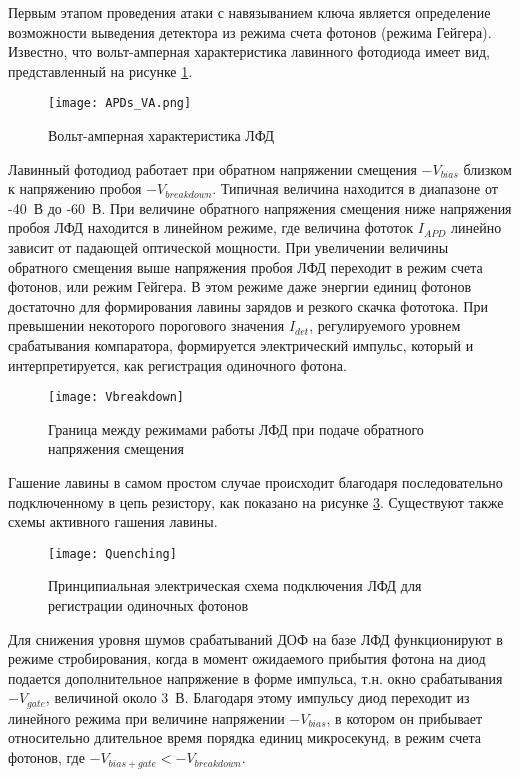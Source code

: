 Первым этапом проведения атаки с навязыванием ключа является определение возможности выведения детектора из режима счета фотонов (режима Гейгера). Известно, что вольт-амперная характеристика лавинного фотодиода имеет вид, представленный на рисунке \ref{fig:APDs_VA}.    

 \begin{figure}[ht]
  \centering
  \texttt{[image: APDs\_VA.png]}
  \caption{Вольт-амперная характеристика ЛФД}
  \label{fig:APDs_VA}
\end{figure}


Лавинный фотодиод работает при обратном напряжении смещения $-V_{bias}$ близком к напряжению пробоя $-V_{breakdown}$. Типичная величина находится в диапазоне от -40~В до -60~В. При величине обратного напряжения смещения ниже напряжения пробоя ЛФД находится в линейном режиме, где величина фототок $I_{APD}$ линейно зависит от падающей оптической мощности. При увеличении величины обратного смещения выше напряжения пробоя ЛФД переходит в режим счета фотонов, или режим Гейгера. В этом режиме даже энергии единиц фотонов достаточно для формирования лавины зарядов и резкого скачка фототока. При превышении некоторого порогового значения $I_{det}$, регулируемого уровнем срабатывания компаратора, формируется электрический импульс, который и интерпретируется, как регистрация одиночного фотона. 

 \begin{figure}[ht]
  \centering
  \texttt{[image: Vbreakdown]}
  \caption{Граница между режимами работы ЛФД при подаче обратного напряжения смещения}
  \label{fig:Vbreakdown}
\end{figure}

Гашение лавины в самом простом случае происходит благодаря последовательно подключенному в цепь резистору, как показано на рисунке \ref{fig:Quenching}. Существуют также схемы активного гашения лавины.  

 \begin{figure}[ht]
  \centering
  \texttt{[image: Quenching]}
  \caption{Принципиальная электрическая схема подключения ЛФД для регистрации одиночных фотонов}
  \label{fig:Quenching}
\end{figure}


Для снижения уровня шумов срабатываний ДОФ на базе ЛФД функционируют в режиме стробирования, когда в момент ожидаемого прибытия фотона на диод подается дополнительное напряжение в форме импульса, т.\:н. окно срабатывания $-V_{gate}$, величиной около 3~В. Благодаря этому импульсу диод переходит из линейного режима при величине напряжении $-V_{bias}$, в котором он прибывает относительно длительное время порядка единиц микросекунд, в режим счета фотонов, где $-V_{bias+gate} < - V_{breakdown}$.  

